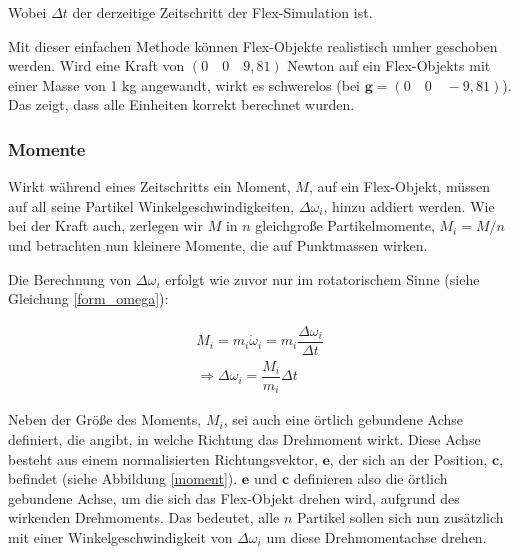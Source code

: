 Wobei $\Delta t$ der derzeitige Zeitschritt der Flex-Simulation ist. 


Mit dieser einfachen Methode können Flex-Objekte realistisch umher geschoben werden. Wird eine Kraft von $(0 \quad 0 \quad 9,81 )$ Newton auf ein Flex-Objekts mit einer Masse von 1 kg angewandt, wirkt es schwerelos (bei $\textbf{g}=(0 \quad 0 \quad -9,81 )$). Das zeigt, dass alle Einheiten korrekt berechnet wurden.


\subsubsection{Momente}

Wirkt während eines Zeitschritts ein Moment, $M$, auf ein Flex-Objekt, müssen auf all seine Partikel Winkelgeschwindigkeiten, $\Delta \omega_i$, hinzu addiert werden. Wie bei der Kraft auch, zerlegen wir $M$ in $n$ gleichgroße Partikelmomente, $M_i=M/n$ und betrachten nun kleinere Momente, die auf Punktmassen wirken.

Die Berechnung von $\Delta \omega_i$ erfolgt wie zuvor nur im rotatorischem Sinne (siehe Gleichung \ref{form_omega}):

\begin{equation}
\begin{split}
M_i = m_i   \dot{\omega}_i = m_i \dfrac{\Delta \omega_i}{\Delta t} \\
\Rightarrow  \Delta \omega_i = \dfrac{M_i}{m_i} \Delta t
\end{split}
\label{form_omega}
\end{equation}


Neben der Größe des Moments, $M_i$, sei auch eine örtlich gebundene Achse definiert, die angibt, in welche Richtung das Drehmoment wirkt. Diese Achse besteht aus einem normalisierten Richtungsvektor, $\textbf{e}$, der sich an der Position, $\textbf{c}$, befindet (siehe Abbildung \ref{moment}). $\textbf{e}$ und $\textbf{c}$ definieren also die örtlich gebundene Achse, um die sich das Flex-Objekt drehen wird, aufgrund des wirkenden Drehmoments. Das bedeutet, alle $n$ Partikel sollen sich nun zusätzlich mit einer Winkelgeschwindigkeit von $\Delta \omega_i$ um diese Drehmomentachse drehen.


